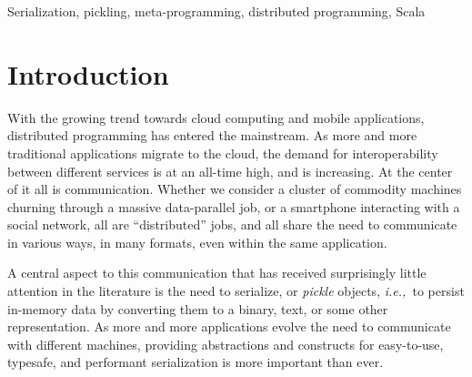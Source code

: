 \documentclass[10pt]{sigplanconf}
\theoremstyle{definition}
\theoremstyle{definition}
\newcommand{\todo}{{\bf \colorbox{red}{\color{white}TODO:}}}
\newcommand{\ie}{{\em i.e.,~}}
\begin{document}
\begin{abstract}


\end{abstract}

\hphantom\linebreak
\vspace{-0.1cm}



\keywords
Serialization, pickling, meta-programming, distributed programming, Scala

\section{Introduction}

With the growing trend towards cloud computing and mobile applications,
distributed programming has entered the mainstream. As more and more
traditional applications migrate to the cloud, the demand for interoperability between
different services is at an all-time high, and is increasing. At the center of
it all is communication. Whether we consider a cluster of commodity machines
churning through a massive data-parallel job, or a smartphone interacting with
a social network, all are ``distributed'' jobs, and all share the need to
communicate in various ways, in many formats, even within the same
application.

A central aspect to this communication that has received surprisingly little
attention in the literature is the need to serialize, or {\em pickle} objects,
\ie to persist in-memory data by converting them to a binary, text, or
some other representation.
As more and more applications evolve the need to communicate with different machines, providing abstractions and constructs for easy-to-use, typesafe, and performant serialization is more important than ever.
\end{document}
